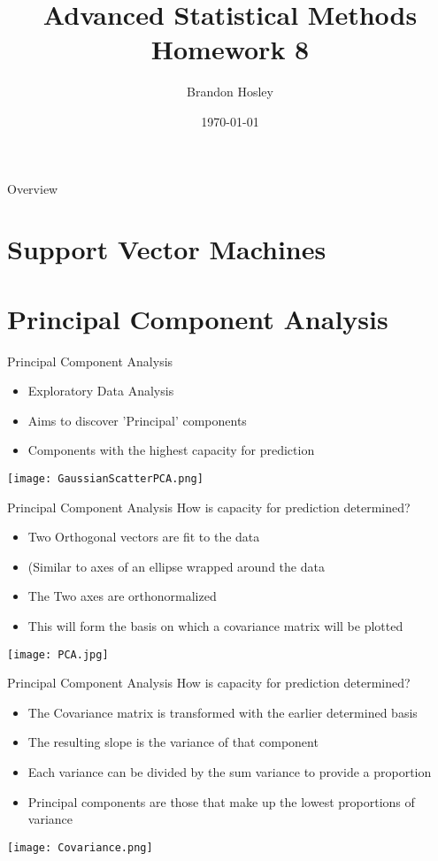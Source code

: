 \documentclass{beamer}
\title{Advanced Statistical Methods \\ Homework 8}
\author{Brandon Hosley}
\institute{University of Illinois - Springfield}
\date{\today}
\begin{document}
\frame{\titlepage}

\begin{frame}{Overview}
\tableofcontents
\end{frame}

\section[SVM]{Support Vector Machines}

\begin{frame}{}

\end{frame}

\section[PCA]{Principal Component Analysis}

\begin{frame}{Principal Component Analysis}
	\begin{itemize}
		\item Exploratory Data Analysis
		\item Aims to discover 'Principal' components 
		\item[] Components with the highest capacity for prediction
	\end{itemize}
	\vspace{1.5em}
	\centering
	\texttt{[image: GaussianScatterPCA.png]}
\end{frame}

\begin{frame}{Principal Component Analysis}
	How is capacity for prediction determined?
	\begin{itemize}
		\item Two Orthogonal vectors are fit to the data
		\item[] (Similar to axes of an ellipse wrapped around the data
		\item The Two axes are orthonormalized
		\item This will form the basis on which a covariance matrix will be plotted
	\end{itemize}
	\vspace{1.5em}
	\centering
	\texttt{[image: PCA.jpg]}
\end{frame}

\begin{frame}{Principal Component Analysis}
	How is capacity for prediction determined?
	\begin{itemize}
		\item The Covariance matrix is transformed with the earlier determined basis
		\item The resulting slope is the variance of that component
		\item Each variance can be divided by the sum variance to provide a proportion
		\item Principal components are those that make up the lowest proportions of variance
	\end{itemize}
	\vspace{1.5em}
	\centering
	\texttt{[image: Covariance.png]}
\end{frame}
\end{document}
